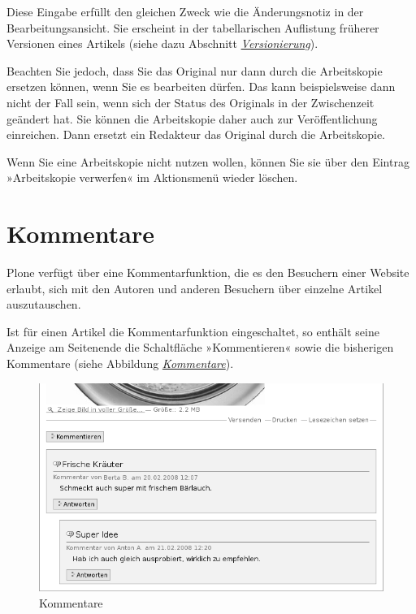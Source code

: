 \documentclass[a4paper,12pt,ngerman]{manual}
\begin{document}
Diese Eingabe erfüllt den gleichen Zweck wie die Änderungsnotiz in der
Bearbeitungsansicht. Sie erscheint in der tabellarischen Auflistung
früherer Versionen eines Artikels (siehe dazu
Abschnitt \hyperlink{sec-undo}{\emph{Versionierung}}).

Beachten Sie jedoch, dass Sie das Original nur dann durch die Arbeitskopie
ersetzen können, wenn Sie es bearbeiten dürfen. Das kann beispielsweise dann
nicht der Fall sein, wenn sich der Status des Originals in der Zwischenzeit
geändert hat. Sie können die Arbeitskopie daher auch zur Veröffentlichung
einreichen. Dann ersetzt ein Redakteur das Original durch die Arbeitskopie.

Wenn Sie eine Arbeitskopie nicht nutzen wollen, können Sie sie über den
Eintrag »Arbeitskopie verwerfen« im Aktionsmenü wieder löschen.

\resetcurrentobjects
\hypertarget{--doc-umgang/diskussionen}{}

\hypertarget{sec-diskussionen}{}\section{Kommentare}

Plone verfügt über eine Kommentarfunktion, die es den Besuchern einer
Website erlaubt, sich mit den Autoren und anderen Besuchern über
einzelne Artikel auszutauschen.

Ist für einen Artikel die Kommentarfunktion eingeschaltet, so enthält seine
Anzeige am Seitenende die Schaltfläche »Kommentieren« sowie die bisherigen
Kommentare (siehe Abbildung \hyperlink{fig-diskussion}{\emph{Kommentare}}).
\hypertarget{fig-diskussion}{}\begin{figure}[htbp]
\centering

\includegraphics{diskussion.png}
\caption{Kommentare}\end{figure}
\end{document}
